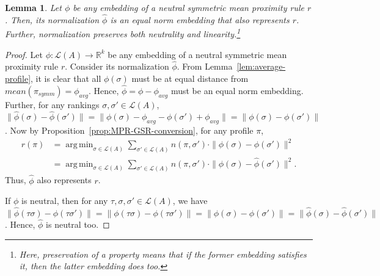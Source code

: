 \documentclass[10pt,letterpaper]{article}
\newcommand{\calL}{{\mathcal{L}}}
\newcommand{\rank}{{\calL(A)}}
\DeclareMathOperator*{\argmin}{arg\,min}
\newtheorem{lemma}{Lemma}
\begin{document}

\begin{lemma}
Let $\phi$ be any embedding of a neutral symmetric mean proximity rule $r$. Then, its normalization $\hat{\phi}$ is an equal norm embedding that also represents $r$. Further, normalization preserves both neutrality and linearity.\footnote{Here, preservation of a property means that if the former embedding satisfies it, then the latter embedding does too.}
\label{lem:preservation}
\end{lemma}
\begin{proof}
Let $\phi : \rank \rightarrow \mathbb{R}^k$ be any embedding of a neutral symmetric mean proximity rule $r$. Consider its normalization $\hat{\phi}$. From Lemma~\ref{lem:average-profile}, it is clear that all $\phi(\sigma)$ must be at equal distance from $mean(\pi_{symm}) = \phi_{avg}$. Hence, $\hat{\phi} = \phi-\phi_{avg}$ must be an equal norm embedding. Further, for any rankings $\sigma, \sigma' \in \rank$, $\|\hat{\phi}(\sigma)-\hat{\phi}(\sigma')\| = \|\phi(\sigma)-\phi_{avg}-\phi(\sigma')+\phi_{avg}\| = \|\phi(\sigma)-\phi(\sigma')\|$. Now by Proposition~\ref{prop:MPR-GSR-conversion}, for any profile $\pi$,
\begin{align*}
r(\pi) &= \argmin_{\sigma \in \rank} \sum_{\sigma' \in \rank} n(\pi,\sigma') \cdot \|\phi(\sigma)-\phi(\sigma')\|^2 \\
&= \argmin_{\sigma \in \rank} \sum_{\sigma' \in \rank} n(\pi,\sigma') \cdot \|\hat{\phi}(\sigma)-\hat{\phi}(\sigma')\|^2.
\end{align*}
Thus, $\hat{\phi}$ also represents $r$. 

If $\phi$ is neutral, then for any $\tau,\sigma,\sigma' \in \rank$, we have $\|\hat{\phi}(\tau \sigma)-\hat{\phi}(\tau \sigma')\| = \|\phi(\tau \sigma)-\phi(\tau \sigma')\| = \|\phi(\sigma)-\phi(\sigma')\| = \|\hat{\phi}(\sigma)-\hat{\phi}(\sigma')\|$. Hence, $\hat{\phi}$ is neutral too. 


\end{proof}
\end{document}

